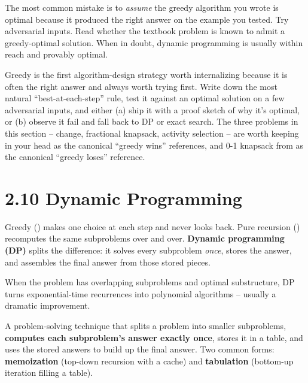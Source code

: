 \documentclass[11pt]{article}
\begin{document}
\begin{warnbox}
The most common mistake is to \emph{assume} the greedy algorithm
you wrote is optimal because it produced the right answer on the
example you tested. Try adversarial inputs. Read whether the
textbook problem is known to admit a greedy-optimal solution. When
in doubt, dynamic programming is usually within reach and
provably optimal.
\end{warnbox}

\begin{ideabox}
Greedy is the first algorithm-design strategy worth internalizing
because it is often the right answer and always worth trying first.
Write down the most natural ``best-at-each-step'' rule, test it
against an optimal solution on a few adversarial inputs, and either
(a) ship it with a proof sketch of why it's optimal, or (b) observe
it fail and fall back to DP or exact search. The three problems in
this section -- change, fractional knapsack, activity selection --
are worth keeping in your head as the canonical ``greedy wins''
references, and 0-1 knapsack from  as the canonical
``greedy loses'' reference.
\end{ideabox}

\section{2.10 Dynamic Programming}

Greedy () makes one choice at each step and never
looks back. Pure recursion () recomputes the same
subproblems over and over. \textbf{Dynamic programming (DP)} splits
the difference: it solves every subproblem \emph{once}, stores the
answer, and assembles the final answer from those stored pieces.

When the problem has overlapping subproblems and optimal
substructure, DP turns exponential-time recurrences into polynomial
algorithms -- usually a dramatic improvement.

\begin{defnbox}
A problem-solving technique that splits a problem into smaller
subproblems, \textbf{computes each subproblem's answer exactly once},
stores it in a table, and uses the stored answers to build up the
final answer. Two common forms: \textbf{memoization} (top-down
recursion with a cache) and \textbf{tabulation} (bottom-up iteration
filling a table).
\end{defnbox}
\end{document}
